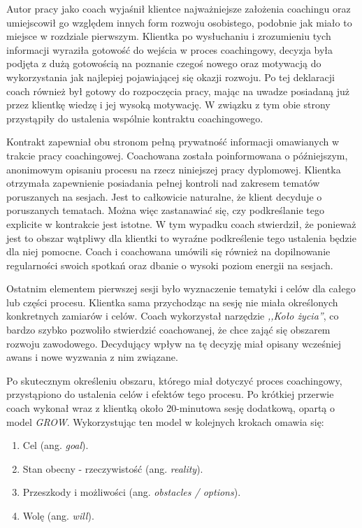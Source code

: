Autor pracy jako coach wyjaśnił klientce najważniejsze założenia coachingu oraz umiejscowił go względem innych form rozwoju osobistego, podobnie jak miało to miejsce
w rozdziale pierwszym. Klientka po wysłuchaniu i zrozumieniu tych informacji wyraziła gotowość do wejścia w proces coachingowy, decyzja była podjęta
z dużą gotowością na poznanie czegoś nowego oraz motywacją do wykorzystania jak najlepiej pojawiającej się okazji rozwoju. Po tej deklaracji coach również
był gotowy do rozpoczęcia pracy, mając na uwadze posiadaną już przez klientkę wiedzę i jej wysoką motywację. W związku z tym obie strony przystąpiły
do ustalenia wspólnie kontraktu coachingowego.

Kontrakt zapewniał obu stronom pełną prywatność informacji omawianych w trakcie pracy coachingowej.
Coachowana została poinformowana o późniejszym, anonimowym opisaniu procesu na rzecz niniejszej pracy dyplomowej.
Klientka otrzymała zapewnienie posiadania pełnej kontroli nad zakresem tematów
poruszanych na sesjach. Jest to całkowicie naturalne, że klient decyduje o poruszanych tematach. Można więc zastanawiać się, czy podkreślanie tego explicite
w kontrakcie jest istotne. W tym wypadku coach stwierdził, że ponieważ jest to obszar wątpliwy dla klientki to wyraźne podkreślenie tego ustalenia
będzie dla niej pomocne. Coach i coachowana umówili się również na dopilnowanie regularności swoich spotkań oraz dbanie o wysoki poziom energii na sesjach.


Ostatnim elementem pierwszej sesji było wyznaczenie tematyki i celów dla całego lub części procesu. Klientka sama przychodząc na sesję nie miała określonych
konkretnych zamiarów i celów. Coach wykorzystał narzędzie \emph{,,Koło życia''}, co bardzo szybko pozwoliło stwierdzić coachowanej, że chce zająć się obszarem
rozwoju zawodowego. Decydujący wpływ na tę decyzję miał opisany wcześniej awans i nowe wyzwania z nim związane.

Po skutecznym określeniu obszaru, którego miał dotyczyć proces coachingowy, przystąpiono do ustalenia celów i efektów tego procesu. Po krótkiej przerwie
coach wykonał wraz z klientką około 20-minutowa sesję dodatkową, opartą o model \emph{GROW}. Wykorzystując ten model w kolejnych krokach omawia się:
\begin{enumerate}
  \item Cel (ang. \emph{goal}).
  \item Stan obecny - rzeczywistość (ang. \emph{reality}).
  \item Przeszkody i możliwości (ang. \emph{obstacles / options}).
  \item Wolę (ang. \emph{will}).
\end{enumerate}

